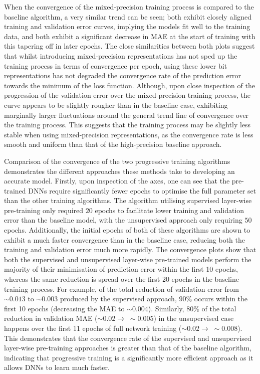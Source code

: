 \documentclass[a4paper, 11pt]{report}
\begin{document}
    When the convergence of the mixed-precision training process is compared to the baseline algorithm, a very similar trend can be seen; both exhibit closely aligned training and validation error curves, implying the models fit well to the training data, and both exhibit a significant decrease in MAE at the start of training with this tapering off in later epochs. The close similarities between both plots suggest that whilst introducing mixed-precision representations has not sped up the training process in terms of convergence per epoch, using these lower bit representations has not degraded the convergence rate of the prediction error towards the minimum of the loss function. Although, upon close inspection of the progression of the validation error over the mixed-precision training process, the curve appears to be slightly rougher than in the baseline case, exhibiting marginally larger fluctuations around the general trend line of convergence over the training process. This suggests that the training process may be slightly less stable when using mixed-precision representations, as the convergence rate is less smooth and uniform than that of the high-precision baseline approach.

    Comparison of the convergence of the two progressive training algorithms demonstrates the different approaches these methods take to developing an accurate model. Firstly, upon inspection of the axes, one can see that the pre-trained DNNs require significantly fewer epochs to optimise the full parameter set than the other training algorithms. The algorithm utilising supervised layer-wise pre-training only required $20$ epochs to facilitate lower training and validation error than the baseline model, with the unsupervised approach only requiring $50$ epochs. Additionally, the initial epochs of both of these algorithms are shown to exhibit a much faster convergence than in the baseline case, reducing both the training and validation error much more rapidly. The convergence plots show that both the supervised and unsupervised layer-wise pre-trained models perform the majority of their minimisation of prediction error within the first 10 epochs, whereas the same reduction is spread over the first 20 epochs in the baseline training process. For example, of the total reduction of validation error from $\sim \! 0.013$ to $\sim \! 0.003$ produced by the supervised approach, $90\%$ occurs within the first 10 epochs (decreasing the MAE to $\sim \! 0.004$). Similarly, $80\%$ of the total reduction in validation MAE ($\sim \! 0.02 \to \; \sim \! 0.005$) in the unsupervised case happens over the first 11 epochs of full network training ($\sim \! 0.02 \to \; \sim \! 0.008$). This demonstrates that the convergence rate of the supervised and unsupervised layer-wise pre-training approaches is greater than that of the baseline algorithm, indicating that progressive training is a significantly more efficient approach as it allows DNNs to learn much faster.
\end{document}
